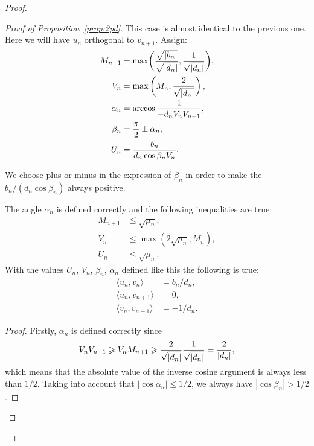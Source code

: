 \begin{proof}
\begin{proof}[Proof of Proposition~\ref{prop:2pd}]
          This case is almost identical to the previous one.
          Here we will have $u_n$ orthogonal to $v_{n+1}$.
          Assign:
          \begin{align*}
            M_{n+1} &= \max\biggl(\smash[t]{\frac{\sqrt{|b_n|}}{\sqrt{|d_n|}}}, \frac{1}{\sqrt{\smash[b]{|d_n|}}}\biggr),\\
            V_n &= \max\left(M_n, \frac{2}{\sqrt{\smash[b]{|d_n|}}}\right),\\
            \alpha_n &= \arccos{\frac{1}{-d_n V_n V_{n+1}}},\\
            \beta_n &= \frac{\pi}{2} \pm \alpha_n,\\
            U_n &= \frac{b_n}{d_n \cos{\beta_n} V_n}.
          \end{align*}
          \begin{remark*}
            We choose plus or minus in the expression of $\beta_n$ in order to make the $b_n/(d_n \cos{\beta_n})$ always positive.
          \end{remark*}
          \begin{prop}
              The angle $\alpha_n$ is defined correctly and the following inequalities are true:
              \begin{align*}
                M_{n+1} &\leq \sqrt{\mu_n},\\
                V_n &\leq \max(2\sqrt{\mu_n}, M_n),\\
                U_n &\leq \sqrt{\mu_n}.
              \end{align*}
              With the values $U_n$, $V_n$, $\beta_n$, $\alpha_n$ defined like this the following is true:
              \begin{equation}
                \label{eqn:case3}
                \begin{aligned}
                  \langle u_n, v_n \rangle &= b_n/d_n,\\
                  \langle u_n, v_{n+1} \rangle &= 0,\\
                  \langle v_n, v_{n+1} \rangle &= -1/d_n.
                \end{aligned}
              \end{equation}
          \end{prop}
          \begin{proof}
            Firstly, $\alpha_n$ is defined correctly since
            \[
              V_n V_{n+1} \geq V_n M_{n+1} \geq \frac{2}{\sqrt{\smash[b]{|d_n|}}} \frac{1}{\sqrt{\smash[b]{|d_n|}}} = \frac{2}{|d_n|},
            \]
              which means that the absolute value of the inverse cosine argument is always less than $1/2$.
            Taking into account that $|\cos{\alpha_n}| \leq 1/2$, we always have $|\cos{\beta_n}| > 1/2$.


\end{proof}
\end{proof}
\end{proof}
